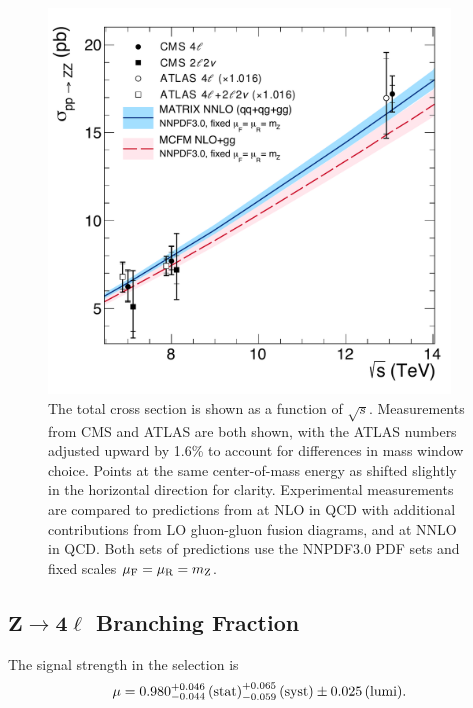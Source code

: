 \begin{figure}[htbp]
  \begin{center}
    \includegraphics[width=0.95\textwidth]{results/sqrts.pdf}
    \caption[Total {\ZZ} cross section as a function of center-of-mass energy]{
        The total {\ZZ} cross section is shown as a function of $\sqrt{s}$.
        Measurements from CMS and ATLAS are both shown, with the ATLAS numbers adjusted upward by 1.6\% to account for differences in {\PZ} mass window choice.
        Points at the same center-of-mass energy as shifted slightly in the horizontal direction for clarity.
        Experimental measurements are compared to predictions from {\MCFM} at NLO in QCD with additional contributions from LO gluon-gluon fusion diagrams, and {\MATRIX} at NNLO in QCD\@.
        Both sets of predictions use the NNPDF3.0 PDF sets and fixed scales $\mu_\text{F} = \mu_\text{R} = m_\mathrm{Z}$.
      }\label{fig:xsec_vs_sqrts}
  \end{center}
\end{figure}


\subsection[\texorpdfstring{$\mathrm{Z} \to 4\ell$}{Z to 4l} Branching  Fraction]{$\mathbf{Z} \to \mathbf{4\ell}$ Branching  Fraction}

The signal strength in the {\Zfourl} selection is
\begin{equation}
  \mu = 0.980 _{-0.044}^{+0.046} \,\text{(stat)} _{-0.059}^{+0.065} \,\text{(syst)} \pm 0.025 \,\text{(lumi)}.
\end{equation}



